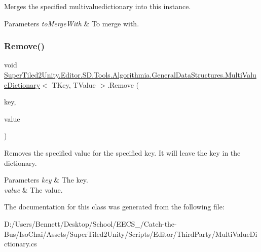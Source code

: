 Merges the specified multivaluedictionary into this instance. 


\begin{DoxyParams}{Parameters}
{\em to\+Merge\+With} & To merge with.\\
\hline
\end{DoxyParams}
\mbox{\label{class_super_tiled2_unity_1_1_editor_1_1_s_d_1_1_tools_1_1_algorithmia_1_1_general_data_structures_1_1_multi_value_dictionary_a084278ce15ca1cd8eb913511fbe5b7df}} 
\subsubsection{\texorpdfstring{Remove()}{Remove()}}
{\footnotesize\ttfamily void \mbox{\hyperlink{class_super_tiled2_unity_1_1_editor_1_1_s_d_1_1_tools_1_1_algorithmia_1_1_general_data_structures_1_1_multi_value_dictionary}{Super\+Tiled2\+Unity.\+Editor.\+S\+D.\+Tools.\+Algorithmia.\+General\+Data\+Structures.\+Multi\+Value\+Dictionary}}$<$ T\+Key, T\+Value $>$.Remove (\begin{DoxyParamCaption}\item[{T\+Key}]{key,  }\item[{T\+Value}]{value }\end{DoxyParamCaption})}



Removes the specified value for the specified key. It will leave the key in the dictionary. 


\begin{DoxyParams}{Parameters}
{\em key} & The key.\\
\hline
{\em value} & The value.\\
\hline
\end{DoxyParams}


The documentation for this class was generated from the following file\+:\begin{DoxyCompactItemize}
\item 
D\+:/\+Users/\+Bennett/\+Desktop/\+School/\+E\+E\+C\+S\+\_/\+Catch-\/the-\/\+Bus/\+Iso\+Chai/\+Assets/\+Super\+Tiled2\+Unity/\+Scripts/\+Editor/\+Third\+Party/Multi\+Value\+Dictionary.\+cs\end{DoxyCompactItemize}
